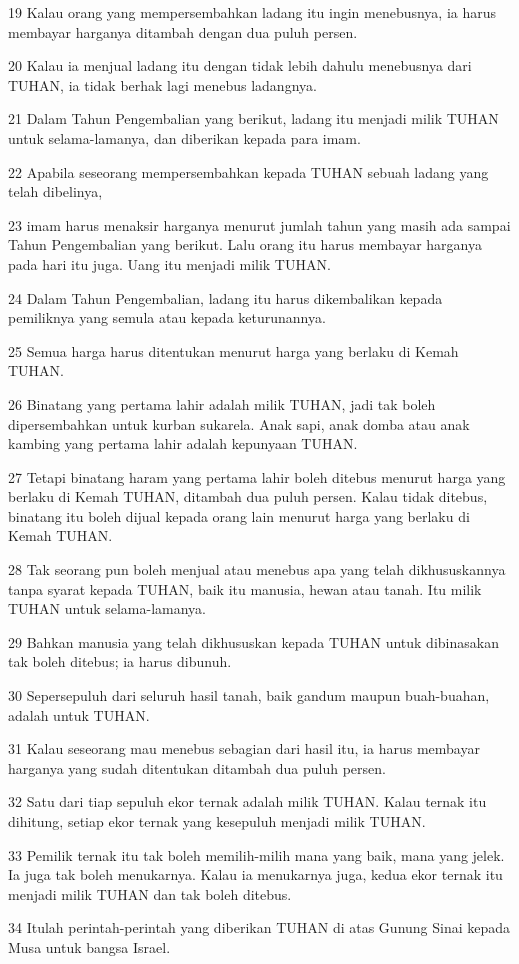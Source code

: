 \par 19 Kalau orang yang mempersembahkan ladang itu ingin menebusnya, ia harus membayar harganya ditambah dengan dua puluh persen.
\par 20 Kalau ia menjual ladang itu dengan tidak lebih dahulu menebusnya dari TUHAN, ia tidak berhak lagi menebus ladangnya.
\par 21 Dalam Tahun Pengembalian yang berikut, ladang itu menjadi milik TUHAN untuk selama-lamanya, dan diberikan kepada para imam.
\par 22 Apabila seseorang mempersembahkan kepada TUHAN sebuah ladang yang telah dibelinya,
\par 23 imam harus menaksir harganya menurut jumlah tahun yang masih ada sampai Tahun Pengembalian yang berikut. Lalu orang itu harus membayar harganya pada hari itu juga. Uang itu menjadi milik TUHAN.
\par 24 Dalam Tahun Pengembalian, ladang itu harus dikembalikan kepada pemiliknya yang semula atau kepada keturunannya.
\par 25 Semua harga harus ditentukan menurut harga yang berlaku di Kemah TUHAN.
\par 26 Binatang yang pertama lahir adalah milik TUHAN, jadi tak boleh dipersembahkan untuk kurban sukarela. Anak sapi, anak domba atau anak kambing yang pertama lahir adalah kepunyaan TUHAN.
\par 27 Tetapi binatang haram yang pertama lahir boleh ditebus menurut harga yang berlaku di Kemah TUHAN, ditambah dua puluh persen. Kalau tidak ditebus, binatang itu boleh dijual kepada orang lain menurut harga yang berlaku di Kemah TUHAN.
\par 28 Tak seorang pun boleh menjual atau menebus apa yang telah dikhususkannya tanpa syarat kepada TUHAN, baik itu manusia, hewan atau tanah. Itu milik TUHAN untuk selama-lamanya.
\par 29 Bahkan manusia yang telah dikhususkan kepada TUHAN untuk dibinasakan tak boleh ditebus; ia harus dibunuh.
\par 30 Sepersepuluh dari seluruh hasil tanah, baik gandum maupun buah-buahan, adalah untuk TUHAN.
\par 31 Kalau seseorang mau menebus sebagian dari hasil itu, ia harus membayar harganya yang sudah ditentukan ditambah dua puluh persen.
\par 32 Satu dari tiap sepuluh ekor ternak adalah milik TUHAN. Kalau ternak itu dihitung, setiap ekor ternak yang kesepuluh menjadi milik TUHAN.
\par 33 Pemilik ternak itu tak boleh memilih-milih mana yang baik, mana yang jelek. Ia juga tak boleh menukarnya. Kalau ia menukarnya juga, kedua ekor ternak itu menjadi milik TUHAN dan tak boleh ditebus.
\par 34 Itulah perintah-perintah yang diberikan TUHAN di atas Gunung Sinai kepada Musa untuk bangsa Israel.


